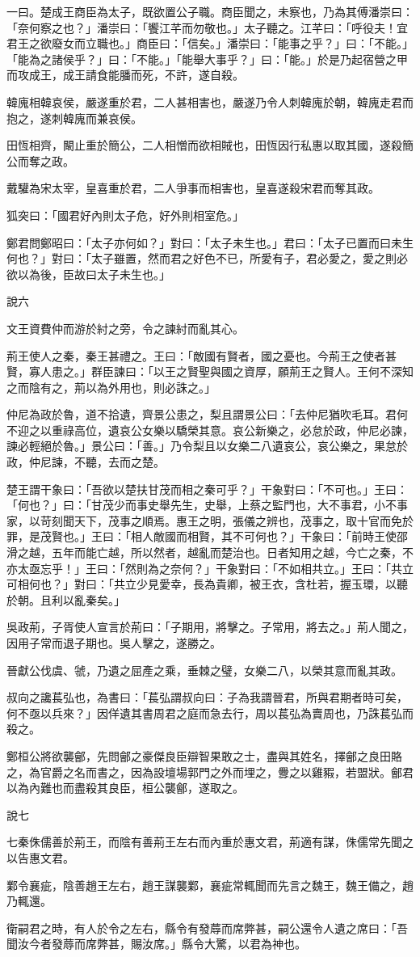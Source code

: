 \begin{pinyinscope}
一曰。楚成王商臣為太子，既欲置公子職。商臣聞之，未察也，乃為其傅潘崇曰：「奈何察之也？」潘崇曰：「饗江芊而勿敬也。」太子聽之。江芊曰：「呼役夫！宜君王之欲廢女而立職也。」商臣曰：「信矣。」潘崇曰：「能事之乎？」曰：「不能。」「能為之諸侯乎？」曰：「不能。」「能舉大事乎？」曰：「能。」於是乃起宿營之甲而攻成王，成王請食能膰而死，不許，遂自殺。

韓廆相韓哀侯，嚴遂重於君，二人甚相害也，嚴遂乃令人刺韓廆於朝，韓廆走君而抱之，遂刺韓廆而兼哀侯。

田恆相齊，闞止重於簡公，二人相憎而欲相賊也，田恆因行私惠以取其國，遂殺簡公而奪之政。

戴驩為宋太宰，皇喜重於君，二人爭事而相害也，皇喜遂殺宋君而奪其政。

狐突曰：「國君好內則太子危，好外則相室危。」

鄭君問鄭昭曰：「太子亦何如？」對曰：「太子未生也。」君曰：「太子已置而曰未生何也？」對曰：「太子雖置，然而君之好色不已，所愛有子，君必愛之，愛之則必欲以為後，臣故曰太子未生也。」

說六

文王資費仲而游於紂之旁，令之諫紂而亂其心。

荊王使人之秦，秦王甚禮之。王曰：「敵國有賢者，國之憂也。今荊王之使者甚賢，寡人患之。」群臣諫曰：「以王之賢聖與國之資厚，願荊王之賢人。王何不深知之而陰有之，荊以為外用也，則必誅之。」

仲尼為政於魯，道不拾遺，齊景公患之，梨且謂景公曰：「去仲尼猶吹毛耳。君何不迎之以重祿高位，遺哀公女樂以驕榮其意。哀公新樂之，必怠於政，仲尼必諫，諫必輕絕於魯。」景公曰：「善。」乃令梨且以女樂二八遺哀公，哀公樂之，果怠於政，仲尼諫，不聽，去而之楚。

楚王謂干象曰：「吾欲以楚扶甘茂而相之秦可乎？」干象對曰：「不可也。」王曰：「何也？」曰：「甘茂少而事史舉先生，史舉，上蔡之監門也，大不事君，小不事家，以苛刻聞天下，茂事之順焉。惠王之明，張儀之辨也，茂事之，取十官而免於罪，是茂賢也。」王曰：「相人敵國而相賢，其不可何也？」干象曰：「前時王使邵滑之越，五年而能亡越，所以然者，越亂而楚治也。日者知用之越，今亡之秦，不亦太亟忘乎！」王曰：「然則為之奈何？」干象對曰：「不如相共立。」王曰：「共立可相何也？」對曰：「共立少見愛幸，長為貴卿，被王衣，含杜若，握玉環，以聽於朝。且利以亂秦矣。」

吳政荊，子胥使人宣言於荊曰：「子期用，將擊之。子常用，將去之。」荊人聞之，因用子常而退子期也。吳人擊之，遂勝之。

晉獻公伐虞、虢，乃遺之屈產之乘，垂棘之璧，女樂二八，以榮其意而亂其政。

叔向之讒萇弘也，為書曰：「萇弘謂叔向曰：子為我謂晉君，所與君期者時可矣，何不亟以兵來？」因佯遺其書周君之庭而急去行，周以萇弘為賣周也，乃誅萇弘而殺之。

鄭桓公將欲襲鄶，先問鄶之豪傑良臣辯智果敢之士，盡與其姓名，擇鄶之良田賂之，為官爵之名而書之，因為設壇場郭門之外而埋之，釁之以雞豭，若盟狀。鄶君以為內難也而盡殺其良臣，桓公襲鄶，遂取之。

說七

七秦侏儒善於荊王，而陰有善荊王左右而內重於惠文君，荊適有謀，侏儒常先聞之以告惠文君。

鄴令襄疵，陰善趙王左右，趙王謀襲鄴，襄疵常輒聞而先言之魏王，魏王備之，趙乃輒還。

衛嗣君之時，有人於令之左右，縣令有發蓐而席弊甚，嗣公還令人遺之席曰：「吾聞汝今者發蓐而席弊甚，賜汝席。」縣令大驚，以君為神也。


\end{pinyinscope}